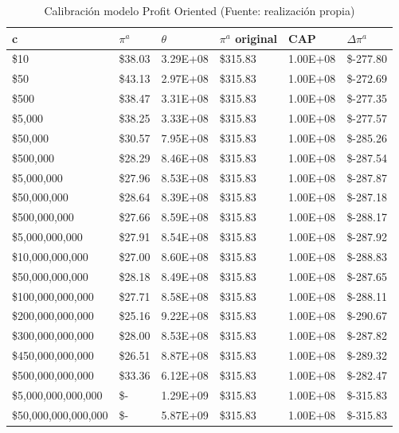 \begin{table}[H]
    \centering
    \begin{tabular}{|l|l|l|l|l|l|}
    \hline
        c & $\pi^a$ & $\theta$ & $\pi^a$ original &  CAP& $\Delta \pi^a$  \\ \hline
         \$10  &  \$38.03  & 3.29E+08 &  \$315.83  & 1.00E+08 &  \$-277.80   \\ \hline
         \$50  &  \$43.13  & 2.97E+08 &  \$315.83  & 1.00E+08 &  \$-272.69   \\ \hline
         \$500  &  \$38.47  & 3.31E+08 &  \$315.83  & 1.00E+08 &  \$-277.35   \\ \hline
         \$5,000  &  \$38.25  & 3.33E+08 &  \$315.83  & 1.00E+08 &  \$-277.57   \\ \hline
         \$50,000  &  \$30.57  & 7.95E+08 &  \$315.83  & 1.00E+08 &  \$-285.26   \\ \hline
         \$500,000  &  \$28.29  & 8.46E+08 &  \$315.83  & 1.00E+08 &  \$-287.54   \\ \hline
         \$5,000,000  &  \$27.96  & 8.53E+08 &  \$315.83  & 1.00E+08 &  \$-287.87   \\ \hline
         \$50,000,000  &  \$28.64  & 8.39E+08 &  \$315.83  & 1.00E+08 &  \$-287.18   \\ \hline
         \$500,000,000  &  \$27.66  & 8.59E+08 &  \$315.83  & 1.00E+08 &  \$-288.17   \\ \hline
         \$5,000,000,000  &  \$27.91  & 8.54E+08 &  \$315.83  & 1.00E+08 &  \$-287.92   \\ \hline
         \$10,000,000,000  &  \$27.00  & 8.60E+08 &  \$315.83  & 1.00E+08 &  \$-288.83   \\ \hline
         \$50,000,000,000  &  \$28.18  & 8.49E+08 &  \$315.83  & 1.00E+08 &  \$-287.65   \\ \hline
         \$100,000,000,000  &  \$27.71  & 8.58E+08 &  \$315.83  & 1.00E+08 &  \$-288.11   \\ \hline
         \$200,000,000,000  &  \$25.16  & 9.22E+08 &  \$315.83  & 1.00E+08 &  \$-290.67   \\ \hline
         \$300,000,000,000  &  \$28.00  & 8.53E+08 &  \$315.83  & 1.00E+08 &  \$-287.82   \\ \hline
         \$450,000,000,000  &  \$26.51  & 8.87E+08 &  \$315.83  & 1.00E+08 &  \$-289.32   \\ \hline
         \$500,000,000,000  &  \$33.36  & 6.12E+08 &  \$315.83  & 1.00E+08 &  \$-282.47   \\ \hline
         \$5,000,000,000,000  &  \$-  & 1.29E+09 &  \$315.83  & 1.00E+08 &  \$-315.83   \\ \hline
         \$50,000,000,000,000  &  \$-  & 5.87E+09 &  \$315.83  & 1.00E+08 &  \$-315.83   \\ \hline
    \end{tabular}
    \caption{{\footnotesize Calibración modelo Profit Oriented (Fuente: realización propia)}}
    \label{calibracionPO}
\end{table}


